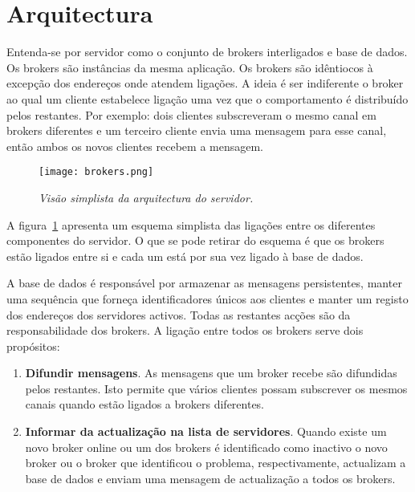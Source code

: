 \section{Arquitectura}
Entenda-se por servidor como o conjunto de brokers interligados e base de dados. 
Os brokers são instâncias da mesma aplicação. Os brokers são idêntiocos à excepção dos endereços onde atendem ligações.
A ideia é ser indiferente o broker ao qual um cliente estabelece ligação uma vez que o comportamento é distribuído pelos restantes.
Por exemplo: dois clientes subscreveram o mesmo canal em brokers diferentes e um terceiro cliente envia uma mensagem para esse canal, então ambos os novos clientes recebem a mensagem.

\begin{figure}[H]
\centering
\texttt{[image: brokers.png]}
\caption{\textit{Visão simplista da arquitectura do servidor.}}
\label{fig:brokers-arq}
\end{figure}

A figura~\ref{fig:brokers-arq} apresenta um esquema simplista das ligações entre os diferentes componentes do servidor. O que se pode retirar do esquema é que os brokers estão ligados entre si e cada um está por sua vez ligado à base de dados.

A base de dados é responsável por armazenar as mensagens persistentes, manter uma sequência que forneça identificadores únicos aos clientes e manter um registo dos endereços dos servidores activos. Todas as restantes acções são da responsabilidade dos brokers. A ligação entre todos os brokers serve dois propósitos:

\begin{enumerate}
\item \textbf{Difundir mensagens}. As mensagens que um broker recebe são difundidas pelos restantes. Isto permite que vários clientes possam subscrever os mesmos canais quando estão ligados a brokers diferentes.
\item \textbf{Informar da actualização na lista de servidores}. Quando existe um novo broker online ou um dos brokers é identificado como inactivo o novo broker ou o broker que identificou o problema, respectivamente, actualizam a base de dados e enviam uma mensagem de actualização a todos os brokers.
\end{enumerate}
